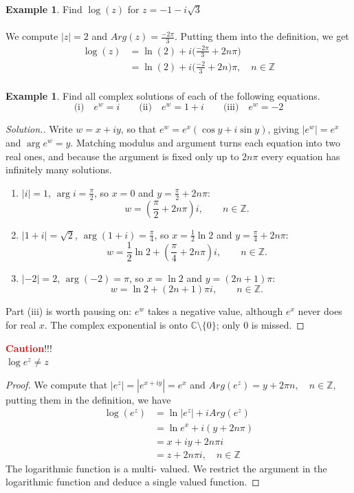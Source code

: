\documentclass[11pt,a4paper]{article}
\theoremstyle{definition}
\newtheorem{example}[thm]{Example}
\newenvironment{solution}
  {\renewcommand{\qedsymbol}{}\begin{proof}[\textit{Solution}.]}
  {\end{proof}}
\begin{document}
\begin{example}
Find $\log (z)$ for $z = -1 - i\sqrt{3}$\\


\text{\textcolor{red}{Solution}}\\
We compute $\left|z\right| = 2$ and $Arg(z) = \frac{-2\pi}{3}$. Putting them into the definition, we get 
\begin{align*}
\log (z)  & = \ln (2) + i \Big(\frac{-2\pi}{3} + 2n\pi\Big)\\
& = \ln (2) + i\Big(\frac{-2}{3} + 2n\Big)\pi, \quad  n\in \mathbb{Z}\\
\end{align*}
\end{example}

\begin{example}
Find all complex solutions of each of the following equations.
$$\text{(i)}\quad e^w = i\qquad \text{(ii)}\quad e^w = 1 + i\qquad
\text{(iii)}\quad e^w = -2$$
\end{example}
\begin{solution}
Write $w=x+iy$, so that $e^w=e^x(\cos y+i\sin y)$, giving
$\left|e^w\right|=e^x$ and $\arg e^w=y$. Matching modulus and argument turns
each equation into two real ones, and because the argument is fixed only up to
$2n\pi$ every equation has infinitely many solutions.
\begin{enumerate}
\item[(i)] $\left|i\right|=1$, $\arg i=\frac{\pi}{2}$, so $x=0$ and
$y=\frac{\pi}{2}+2n\pi$:
$$w=\left(\frac{\pi}{2}+2n\pi\right)i,\qquad n\in\mathbb{Z}.$$
\item[(ii)] $\left|1+i\right|=\sqrt2$, $\arg(1+i)=\frac{\pi}{4}$, so
$x=\frac{1}{2}\ln 2$ and $y=\frac{\pi}{4}+2n\pi$:
$$w=\frac{1}{2}\ln 2+\left(\frac{\pi}{4}+2n\pi\right)i,\qquad n\in\mathbb{Z}.$$
\item[(iii)] $\left|-2\right|=2$, $\arg(-2)=\pi$, so $x=\ln 2$ and
$y=(2n+1)\pi$:
$$w=\ln 2+(2n+1)\pi i,\qquad n\in\mathbb{Z}.$$
\end{enumerate}
Part (iii) is worth pausing on: $e^w$ takes a negative value, although $e^x$
never does for real $x$. The complex exponential is onto
$\mathbb{C}\setminus\{0\}$; only $0$ is missed.
\end{solution}

\textbf{\textcolor{red}{Caution}}!!!\\
$\log e^z\neq z$\\


\begin{proof}
We compute that $\left|e^z\right| = \left|e^{x + iy}\right| = e^x$ and $Arg(e^z) = y + 2\pi n, \quad  n\in \mathbb{Z}$, putting them in the definition, we have 
\begin{align*}
\log (e^z) & = \ln \left|e^z\right| + iArg(e^z)\\
& = \ln e^x + i (y  + 2n\pi)\\
& = x + iy + 2n\pi i\\
& = z + 2n\pi i, \quad  n\in \mathbb{Z}
\end{align*}
The logarithmic function is a multi- valued. We restrict the argument in the logarithmic function and deduce a single valued function.
\end{proof}
\end{document}
